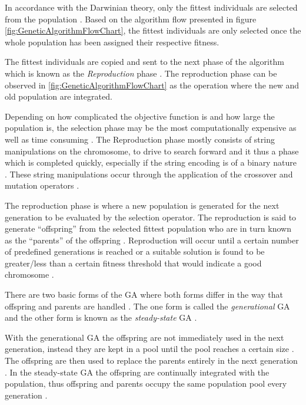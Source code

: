 In accordance with the Darwinian theory, only the fittest individuals are selected from the population \cite{HumanPassiveGA}. Based on the algorithm flow presented in figure \ref{fig:GeneticAlgorithmFlowChart}, the fittest individuals are only selected once the whole population has been assigned their respective fitness. 

The fittest individuals are copied and sent to the next phase of the algorithm which is known as the \emph{Reproduction} phase \cite{HumanPassiveGA}. The reproduction phase can be observed in \ref{fig:GeneticAlgorithmFlowChart} as the operation where the new and old population are integrated.

Depending on how complicated the objective function is and how large the population is, the selection phase may be the most computationally expensive as well as time consuming \cite{AcceleratingGA}. The Reproduction phase mostly consists of string manipulations on the chromosome, to drive to search forward and it thus a phase which is completed quickly, especially if the string encoding is of a binary nature \cite{AcceleratingGA,AdaptiveSAGA}. These string manipulations occur through the application of the crossover and mutation operators \cite{ConstrainedGA}. 

The reproduction phase is where a new population is generated for the next generation to be evaluated by the selection operator. The reproduction is said to generate ``offspring'' from the selected fittest population who are in turn known as the ``parents'' of the offspring \cite{HumanPassiveGA,ConstrainedGA}. Reproduction will occur until a certain number of predefined generations is reached or a suitable solution is found to be greater/less than a certain fitness threshold that would indicate a good chromosome \cite{GATSP}.

There are two basic forms of the GA where both forms differ in the way that offspring and parents are handled \cite{FamilyGA}. The one form is called the \emph{generational} GA  and the other form is known as the \emph{steady-state} GA \cite{GeostatisticalGA,FamilyGA}.

With the generational GA the offspring are not immediately used in the next generation, instead they are kept in a pool until the pool reaches a certain size \cite{FamilyGA}. The offspring are then used to replace the parents entirely in the next generation \cite{FamilyGA}. In the steady-state GA the offspring are continually integrated with the population, thus offspring and parents occupy the same population pool every generation \cite{GeostatisticalGA,FamilyGA}.

